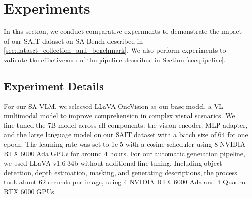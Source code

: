 \section{Experiments}
In this section, we conduct comparative experiments to demonstrate the impact of our SAIT dataset on SA-Bench described in \ref{sec:dataset_collection_and_benchmark}. 
We also perform experiments to validate the effectiveness of the pipeline described in Section \ref{sec:pipeline}.

\vspace{-5pt}
\subsection{Experiment Details}
For our SA-VLM, we selected LLaVA-OneVision \cite{li2024llavaonevisioneasyvisualtask}  as our base model, a VL multimodal model to improve comprehension in complex visual scenarios.
We fine-tuned the 7B model across all components: the vision encoder, MLP adapter, and the large language model on our SAIT dataset with a batch size of 64 for one epoch. 
The learning rate was set to 1e-5 with a cosine scheduler using 8 NVIDIA RTX 6000 Ada GPUs for around 4 hours.
For our automatic generation pipeline, we used LLaVA-v1.6-34b \cite{liu2023improved} without additional fine-tuning. 
Including object detection, depth estimation, masking, and generating descriptions, the process took about 62 seconds per image, using 4 NVIDIA RTX 6000 Ada and 4 Quadro RTX 6000 GPUs.


